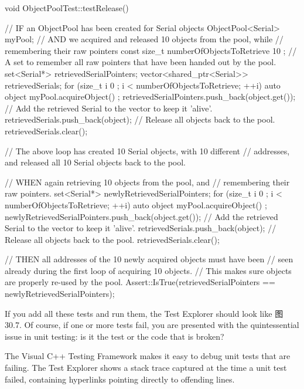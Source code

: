 \begin{cpp}
void ObjectPoolTest::testRelease()
{
    // IF an ObjectPool has been created for Serial objects
    ObjectPool<Serial> myPool;
    // AND we acquired and released 10 objects from the pool, while
    //     remembering their raw pointers
    const size_t numberOfObjectsToRetrieve { 10 };
    // A set to remember all raw pointers that have been handed out by the pool.
    set<Serial*> retrievedSerialPointers;
    vector<shared_ptr<Serial>> retrievedSerials;
    for (size_t i { 0 }; i < numberOfObjectsToRetrieve; ++i) {
        auto object { myPool.acquireObject() };
        retrievedSerialPointers.push_back(object.get());
        // Add the retrieved Serial to the vector to keep it 'alive'.
        retrievedSerials.push_back(object);
    }
    // Release all objects back to the pool.
    retrievedSerials.clear();

    // The above loop has created 10 Serial objects, with 10 different
    // addresses, and released all 10 Serial objects back to the pool.

    // WHEN again retrieving 10 objects from the pool, and
    //      remembering their raw pointers.
    set<Serial*> newlyRetrievedSerialPointers;
    for (size_t i { 0 }; i < numberOfObjectsToRetrieve; ++i) {
        auto object { myPool.acquireObject() };
        newlyRetrievedSerialPointers.push_back(object.get());
        // Add the retrieved Serial to the vector to keep it 'alive'.
        retrievedSerials.push_back(object);
    }
    // Release all objects back to the pool.
    retrievedSerials.clear();

    // THEN all addresses of the 10 newly acquired objects must have been
    //      seen already during the first loop of acquiring 10 objects.
    //      This makes sure objects are properly re-used by the pool.
    Assert::IsTrue(retrievedSerialPointers == newlyRetrievedSerialPointers);
}
\end{cpp}

If you add all these tests and run them, the Test Explorer should look like 图 30.7. Of course, if one or more tests fail, you are presented with the quintessential issue in unit testing: is it the test or the code that is broken?



The Visual C++ Testing Framework makes it easy to debug unit tests that are failing. The Test Explorer shows a stack trace captured at the time a unit test failed, containing hyperlinks pointing directly to offending lines.

